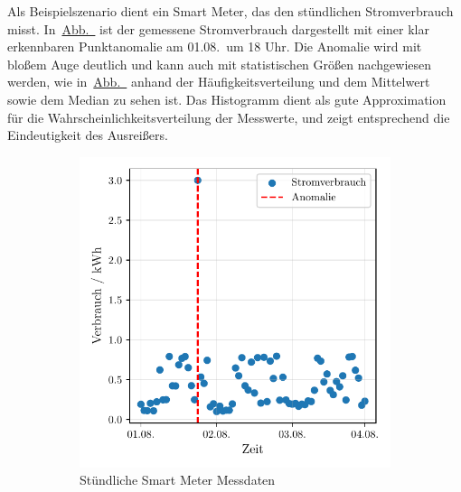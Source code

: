Als Beispielszenario dient ein Smart Meter, das den stündlichen Stromverbrauch misst.
In~\hyperref[subfig:smartmeter]{Abb.~} ist der gemessene Stromverbrauch dargestellt mit einer klar
erkennbaren Punktanomalie am 01.08.~um 18 Uhr. Die Anomalie wird mit bloßem Auge deutlich und kann auch mit statistischen Größen
nachgewiesen werden, wie in~\hyperref[subfig:smartmeter_histogramm]{Abb.~} anhand der
Häufigkeitsverteilung und dem Mittelwert sowie dem Median zu sehen ist. Das Histogramm dient als gute Approximation für die
Wahrscheinlichkeitsverteilung der Messwerte, und zeigt entsprechend die Eindeutigkeit des Ausreißers.

\begin{figure}[!t]
    \centering
    \begin{subfigure}[b]{0.49\linewidth}
        \includegraphics[width=\linewidth]{ch4_anomalien/abbildungen/punktanomalie_bsp.pdf}
        \caption{Stündliche Smart Meter Messdaten}\label{subfig:smartmeter}
    \end{subfigure}
    \begin{subfigure}[b]{0.49\linewidth}

\end{subfigure}
\end{figure}
